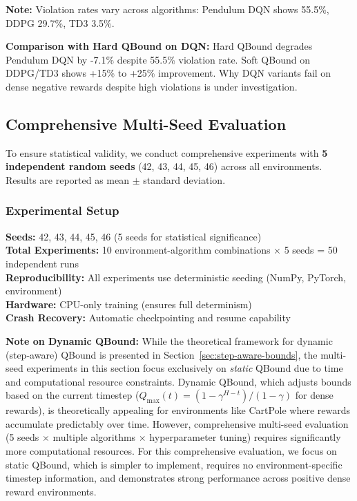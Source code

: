 \documentclass[11pt]{article}
\theoremstyle{definition}
\theoremstyle{remark}
\begin{document}
\textbf{Note:} Violation rates vary across algorithms: Pendulum DQN shows 55.5\%, DDPG 29.7\%, TD3 3.5\%.

\textbf{Comparison with Hard QBound on DQN:} Hard QBound degrades Pendulum DQN by -7.1\% despite 55.5\% violation rate. Soft QBound on DDPG/TD3 shows +15\% to +25\% improvement. Why DQN variants fail on dense negative rewards despite high violations is under investigation.

\subsection{Comprehensive Multi-Seed Evaluation}
\label{subsec:multiseed-results}

To ensure statistical validity, we conduct comprehensive experiments with \textbf{5 independent random seeds} (42, 43, 44, 45, 46) across all environments. Results are reported as mean $\pm$ standard deviation.

\subsubsection{Experimental Setup}

\textbf{Seeds:} 42, 43, 44, 45, 46 (5 seeds for statistical significance) \\
\textbf{Total Experiments:} 10 environment-algorithm combinations $\times$ 5 seeds = 50 independent runs \\
\textbf{Reproducibility:} All experiments use deterministic seeding (NumPy, PyTorch, environment) \\
\textbf{Hardware:} CPU-only training (ensures full determinism) \\
\textbf{Crash Recovery:} Automatic checkpointing and resume capability

\textbf{Note on Dynamic QBound:} While the theoretical framework for dynamic (step-aware) QBound is presented in Section~\ref{sec:step-aware-bounds}, the multi-seed experiments in this section focus exclusively on \textit{static} QBound due to time and computational resource constraints. Dynamic QBound, which adjusts bounds based on the current timestep ($Q_{\max}(t) = (1-\gamma^{H-t})/(1-\gamma)$ for dense rewards), is theoretically appealing for environments like CartPole where rewards accumulate predictably over time. However, comprehensive multi-seed evaluation (5 seeds $\times$ multiple algorithms $\times$ hyperparameter tuning) requires significantly more computational resources. For this comprehensive evaluation, we focus on static QBound, which is simpler to implement, requires no environment-specific timestep information, and demonstrates strong performance across positive dense reward environments.
\end{document}
